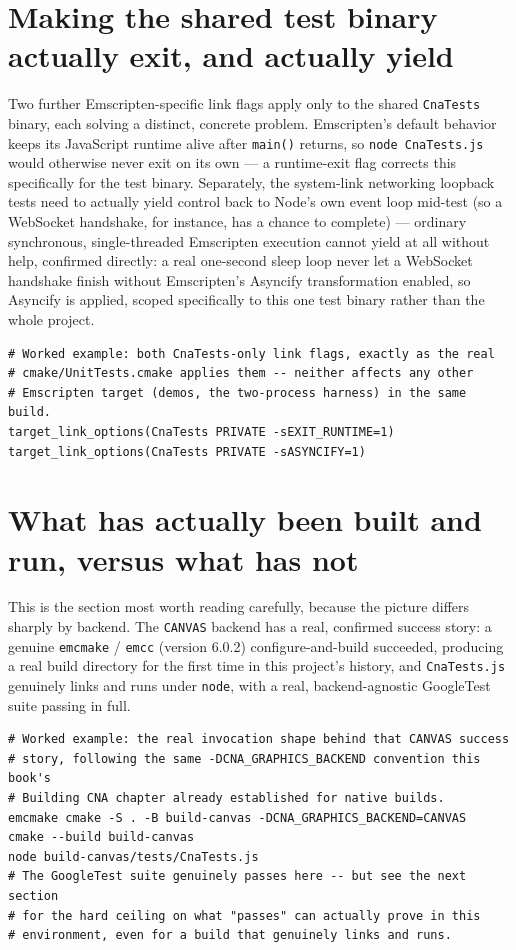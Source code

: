 \section{Making the shared test binary actually exit, and actually yield}

Two further Emscripten-specific link flags apply only to the shared \texttt{CnaTests} binary,
each solving a distinct, concrete problem. Emscripten's default behavior keeps its JavaScript
runtime alive after \texttt{main()} returns, so \texttt{node CnaTests.js} would otherwise never
exit on its own --- a runtime-exit flag corrects this specifically for the test binary.
Separately, the system-link networking loopback tests need to actually yield control back to
Node's own event loop mid-test (so a WebSocket handshake, for instance, has a chance to
complete) --- ordinary synchronous, single-threaded Emscripten execution cannot yield at all
without help, confirmed directly: a real one-second sleep loop never let a WebSocket handshake
finish without Emscripten's Asyncify transformation enabled, so Asyncify is applied, scoped
specifically to this one test binary rather than the whole project.

\begin{lstlisting}[style=cnashell]
# Worked example: both CnaTests-only link flags, exactly as the real
# cmake/UnitTests.cmake applies them -- neither affects any other
# Emscripten target (demos, the two-process harness) in the same build.
target_link_options(CnaTests PRIVATE -sEXIT_RUNTIME=1)
target_link_options(CnaTests PRIVATE -sASYNCIFY=1)
\end{lstlisting}

\section{What has actually been built and run, versus what has not}

This is the section most worth reading carefully, because the picture differs sharply by
backend. The \texttt{CANVAS} backend has a real, confirmed success story: a genuine
\texttt{emcmake} / \texttt{emcc} (version 6.0.2) configure-and-build succeeded, producing a real
build directory for the first time in this project's history, and \texttt{CnaTests.js}
genuinely links and runs under \texttt{node}, with a real, backend-agnostic GoogleTest suite
passing in full.

\begin{lstlisting}[style=cnashell]
# Worked example: the real invocation shape behind that CANVAS success
# story, following the same -DCNA_GRAPHICS_BACKEND convention this book's
# Building CNA chapter already established for native builds.
emcmake cmake -S . -B build-canvas -DCNA_GRAPHICS_BACKEND=CANVAS
cmake --build build-canvas
node build-canvas/tests/CnaTests.js
# The GoogleTest suite genuinely passes here -- but see the next section
# for the hard ceiling on what "passes" can actually prove in this
# environment, even for a build that genuinely links and runs.
\end{lstlisting}

